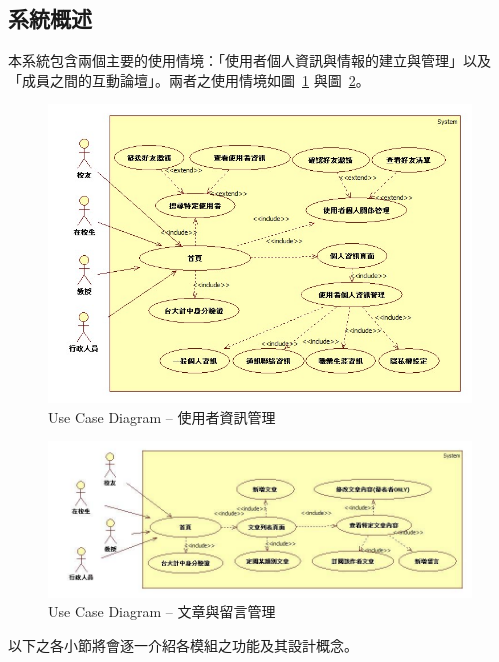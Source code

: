 \subsection{系統概述}

本系統包含兩個主要的使用情境：「使用者個人資訊與情報的建立與管理」以及「成員之間的互動論壇」。兩者之使用情境如圖~\ref{pic:use:userLogin} 與圖~\ref{pic:use:forum}。

\begin{figure}[H]
\centering
\includegraphics[width=.95\textwidth]{img/useseq/stage1/userProfile.jpg}
\caption{Use Case Diagram -- 使用者資訊管理}
\label{pic:use:userLogin}
\end{figure}

\begin{figure}[H]
\centering
\includegraphics[width=1.05\textwidth]{img/useseq/stage2/useForum.jpg}
\caption{Use Case Diagram -- 文章與留言管理}
\label{pic:use:forum}
\end{figure}

以下之各小節將會逐一介紹各模組之功能及其設計概念。

